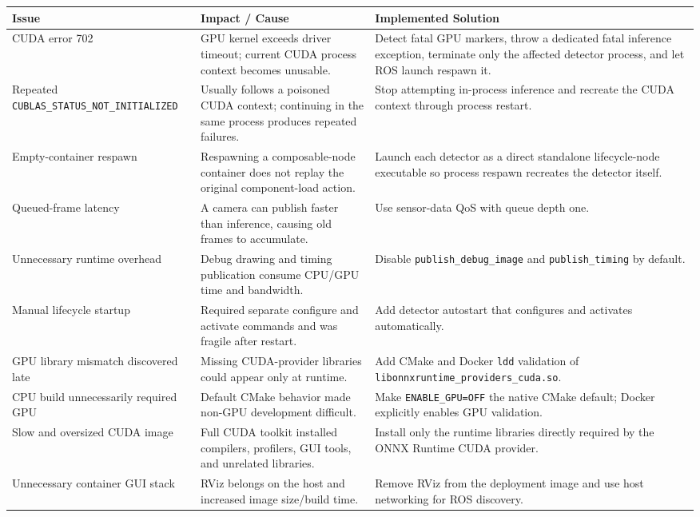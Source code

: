 \documentclass[11pt,a4paper]{article}
\begin{document}
\begin{longtable}{p{} p{} p{}}
\toprule
\textbf{Issue} & \textbf{Impact / Cause} & \textbf{Implemented Solution} \\
\midrule
\endhead
CUDA error 702 & GPU kernel exceeds driver timeout; current CUDA process context becomes unusable. & Detect fatal GPU markers, throw a dedicated fatal inference exception, terminate only the affected detector process, and let ROS launch respawn it. \\
Repeated \texttt{CUBLAS\_STATUS\_NOT\_INITIALIZED} & Usually follows a poisoned CUDA context; continuing in the same process produces repeated failures. & Stop attempting in-process inference and recreate the CUDA context through process restart. \\
Empty-container respawn & Respawning a composable-node container does not replay the original component-load action. & Launch each detector as a direct standalone lifecycle-node executable so process respawn recreates the detector itself. \\
Queued-frame latency & A camera can publish faster than inference, causing old frames to accumulate. & Use sensor-data QoS with queue depth one. \\
Unnecessary runtime overhead & Debug drawing and timing publication consume CPU/GPU time and bandwidth. & Disable \texttt{publish\_debug\_image} and \texttt{publish\_timing} by default. \\
Manual lifecycle startup & Required separate configure and activate commands and was fragile after restart. & Add detector autostart that configures and activates automatically. \\
GPU library mismatch discovered late & Missing CUDA-provider libraries could appear only at runtime. & Add CMake and Docker \texttt{ldd} validation of \texttt{libonnxruntime\_providers\_cuda.so}. \\
CPU build unnecessarily required GPU & Default CMake behavior made non-GPU development difficult. & Make \texttt{ENABLE\_GPU=OFF} the native CMake default; Docker explicitly enables GPU validation. \\
Slow and oversized CUDA image & Full CUDA toolkit installed compilers, profilers, GUI tools, and unrelated libraries. & Install only the runtime libraries directly required by the ONNX Runtime CUDA provider. \\
Unnecessary container GUI stack & RViz belongs on the host and increased image size/build time. & Remove RViz from the deployment image and use host networking for ROS discovery. \\

\end{longtable}
\end{document}
